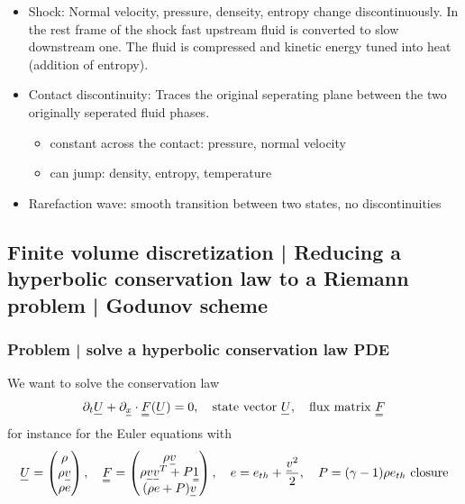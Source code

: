 \begin{itemize}
    \item \textcolor{blue1}{Shock:} Normal velocity, pressure, denseity, entropy change discontinuously. In the rest frame of the shock fast upstream fluid is converted to slow downstream one. The fluid is compressed and kinetic energy tuned into heat (addition of entropy).
    \item \textcolor{blue1}{Contact discontinuity:} Traces the original seperating plane between the two originally seperated fluid phases.
    \begin{itemize}
        \item \textcolor{blue1}{constant across the contact:} pressure, normal velocity
        \item \textcolor{blue1}{can jump:} density, entropy, temperature
    \end{itemize}
    \item \textcolor{blue1}{Rarefaction wave:} smooth transition between two states, no discontinuities
\end{itemize}

\subsection{Finite volume discretization | Reducing a hyperbolic conservation law to a Riemann problem | Godunov scheme}

\subsubsection{Problem | solve a hyperbolic conservation law PDE}
We want to solve the conservation law
\begin{equation}
    \partial_t \vec{U} + \partial_\vec{x} \cdot \mat{F}(\vec{U}) = 0, \quad \text{state vector } \vec{U}, \quad \text{flux matrix } \mat{F}
\end{equation}
for instance for the Euler equations with
\begin{equation}
    \label{eq:euler_equations_vec}
    \vec{U} = \begin{pmatrix} \rho \\ \rho \vec{v} \\ \rho e \end{pmatrix}, \quad \mat{F} = \begin{pmatrix} \rho \vec{v} \\ \rho \vec{v} \vec{v}^T + P \mat{1} \\ (\rho e + P) \vec{v} \end{pmatrix}, \quad e = e_{th} + \frac{\vec{v}^2}{2}, \quad P = (\gamma - 1) \rho e_{th} \text{ closure}
\end{equation}

